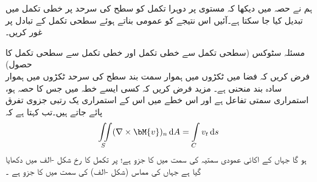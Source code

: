 ہم نے حصہ  میں دیکھا کہ مستوی پر دوہرا تکمل کو سطح کی سرحد پر خطی تکمل میں تبدیل کیا جا سکتا ہے۔آئیں اس نتیجے کو عمومی بناتے ہوئے سطحی تکمل کے تبادل پر غور کریں۔

\quad مسئلہ سٹوکس (سطحی تکمل سے خطی تکمل اور خطی تکمل سے سطحی تکمل کا حصول)\\
فرض کریں کہ فضا میں ٹکڑوں میں ہموار سمت بند سطح  کی سرحد  ٹکڑوں میں ہموار سادہ بند منحنی  ہے۔ مزید فرض کریں کہ کسی ایسے خطہ میں جس کا  حصہ ہو،  استمراری سمتی تفاعل ہے اور اس خطے میں اس  کے استمراری یک رتبی جزوی تفرق پائے جاتے ہیں۔تب  کہتا ہے کہ
\begin{align}\label{مساوات_خطی_تکمل_سٹوکس_الف}
\iint\limits_S (\nabla \times \bM{v})_n \dif A=\int\limits_C v_t \dif s
\end{align}
ہو گا جہاں  کے اکائی عمودی سمتیہ  کی سمت میں  کا جزو  ہے؛  پر تکمل کا رخ شکل -الف میں دکھایا گیا ہے جہاں  کی مماس  (شکل -الف) کی سمت میں   کا جزو  ہے ۔

